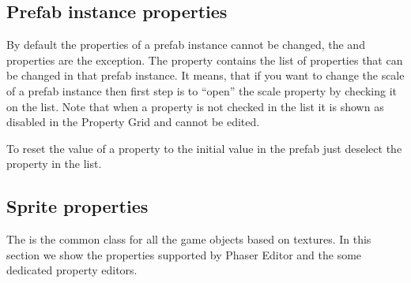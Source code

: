 \documentclass[letterpaper,10pt,english]{sphinxmanual}
\begin{document}
\noindent{}

\noindent{}


\subsection{Prefab instance properties}
\label{\detokenize{canvas:prefab-instance-properties}}
By default the properties of a prefab instance cannot be changed, the  and  properties are the exception. The  property contains the list of properties that can be changed in that prefab instance. It means, that if you want to change the scale of a prefab instance then first step is to “open” the scale property by checking it on the  list. Note that when a property is not checked in the  list it is shown as disabled in the Property Grid and cannot be edited.

To reset the value of a property to the initial value in the prefab just deselect the property in the  list.

\noindent{}


\subsection{Sprite properties}
\label{\detokenize{canvas:sprite-properties}}
The  is the common class for all the game objects based on textures. In this section we show the properties supported by Phaser Editor and the some dedicated property editors.
\end{document}
